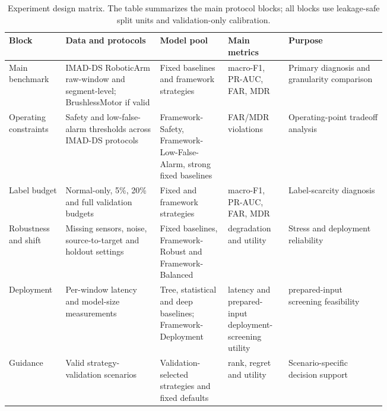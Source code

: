 \begin{table}[!htbp]
\centering
\footnotesize
\setlength{\tabcolsep}{4pt}
\renewcommand{\arraystretch}{1.12}
\caption{Experiment design matrix. The table summarizes the main protocol blocks; all blocks use leakage-safe split units and validation-only calibration.}
\label{tab:experiment-design}
\begin{tabularx}{\linewidth}{@{}>{\RaggedRight\arraybackslash}p{0.15\linewidth}>{\RaggedRight\arraybackslash}p{0.25\linewidth}>{\RaggedRight\arraybackslash}p{0.18\linewidth}>{\RaggedRight\arraybackslash}p{0.16\linewidth}>{\RaggedRight\arraybackslash}X@{}}
\toprule
Block & Data and protocols & Model pool & Main metrics & Purpose \\
\midrule
Main benchmark & IMAD-DS RoboticArm raw-window and segment-level; BrushlessMotor if valid & Fixed baselines and framework strategies & macro-F1, PR-AUC, FAR, MDR & Primary diagnosis and granularity comparison \\
Operating constraints & Safety and low-false-alarm thresholds across IMAD-DS protocols & Framework-Safety, Framework-Low-False-Alarm, strong fixed baselines & FAR/MDR violations & Operating-point tradeoff analysis \\
Label budget & Normal-only, 5\%, 20\% and full validation budgets & Fixed and framework strategies & macro-F1, PR-AUC, FAR, MDR & Label-scarcity diagnosis \\
Robustness and shift & Missing sensors, noise, source-to-target and holdout settings & Fixed baselines, Framework-Robust and Framework-Balanced & degradation and utility & Stress and deployment reliability \\
Deployment & Per-window latency and model-size measurements & Tree, statistical and deep baselines; Framework-Deployment & latency and prepared-input deployment-screening utility & prepared-input screening feasibility \\
Guidance & Valid strategy-validation scenarios & Validation-selected strategies and fixed defaults & rank, regret and utility & Scenario-specific decision support \\
\bottomrule
\end{tabularx}
\end{table}
